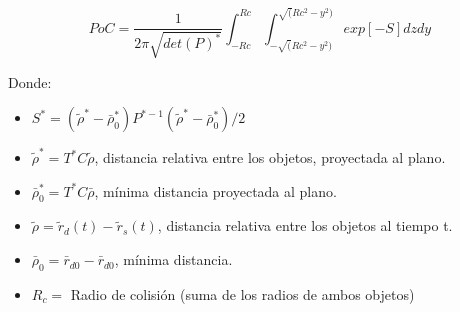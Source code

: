 \begin{equation}
 PoC=\frac{1}{2 \pi \sqrt{det(P)^{*}}}\int_{-Rc}^{Rc}\int_{-\sqrt(Rc^{2}-y^{2})}^{\sqrt(Rc^{2}-y^{2})}exp [-S] dzdy
 \label{eq:integralAkella}
\end{equation}

Donde:

\begin{itemize}
 \item $S^{*}=(\tilde{\rho}^{*}-\bar{\rho}_{0}^{*})P^{*-1}(\tilde{\rho}^{*}-\bar{\rho}_{0}^{*})/2$
 \item $\tilde{\rho}^{*}=T^{*}C\tilde{\rho}$, distancia relativa entre los objetos, proyectada al plano.
 \item $\bar{\rho}_{0}^{*}=T^{*}C\bar{\rho}$, m\'inima distancia proyectada al plano.
 \item $\tilde{\rho}= \tilde{r}_{d}(t)-\tilde{r}_{s}(t)$, distancia relativa entre los objetos al tiempo t.
 \item $\bar{\rho}_{0}=\bar{r}_{d0}-\bar{r}_{d0}$, m\'inima distancia.
 \item $R_{c}=$ Radio de colisi\'on (suma de los radios de ambos objetos)
\end{itemize}



